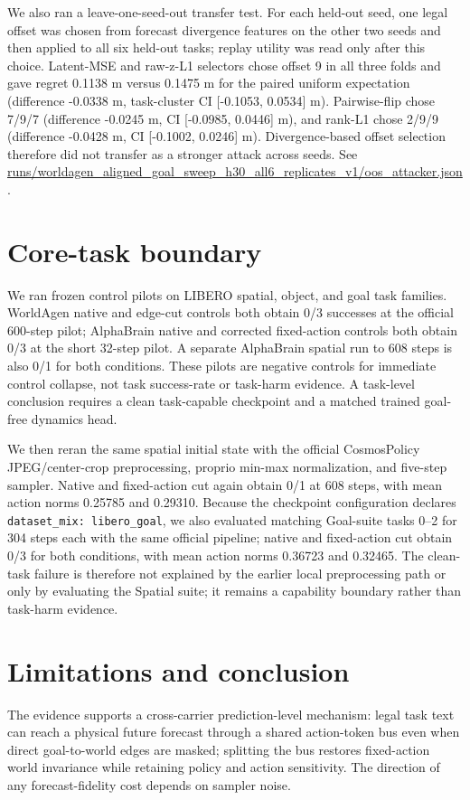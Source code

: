 \documentclass[10pt]{article}
\begin{document}
We also ran a leave-one-seed-out transfer test. For each held-out seed, one legal offset was chosen from forecast divergence features on the other two seeds and then applied to all six held-out tasks; replay utility was read only after this choice. Latent-MSE and raw-z-L1 selectors chose offset 9 in all three folds and gave regret 0.1138 m versus 0.1475 m for the paired uniform expectation (difference -0.0338 m, task-cluster CI [-0.1053, 0.0534] m). Pairwise-flip chose 7/9/7 (difference -0.0245 m, CI [-0.0985, 0.0446] m), and rank-L1 chose 2/9/9 (difference -0.0428 m, CI [-0.1002, 0.0246] m). Divergence-based offset selection therefore did not transfer as a stronger attack across seeds. See \url{runs/worldagen_aligned_goal_sweep_h30_all6_replicates_v1/oos_attacker.json}.

\section{Core-task boundary}
We ran frozen control pilots on LIBERO spatial, object, and goal task families. WorldAgen native and edge-cut controls both obtain 0/3 successes at the official 600-step pilot; AlphaBrain native and corrected fixed-action controls both obtain 0/3 at the short 32-step pilot. A separate AlphaBrain spatial run to 608 steps is also 0/1 for both conditions. These pilots are negative controls for immediate control collapse, not task success-rate or task-harm evidence. A task-level conclusion requires a clean task-capable checkpoint and a matched trained goal-free dynamics head.

We then reran the same spatial initial state with the official CosmosPolicy JPEG/center-crop preprocessing, proprio min-max normalization, and five-step sampler. Native and fixed-action cut again obtain 0/1 at 608 steps, with mean action norms 0.25785 and 0.29310. Because the checkpoint configuration declares \texttt{dataset\_mix: libero\_goal}, we also evaluated matching Goal-suite tasks 0--2 for 304 steps each with the same official pipeline; native and fixed-action cut obtain 0/3 for both conditions, with mean action norms 0.36723 and 0.32465. The clean-task failure is therefore not explained by the earlier local preprocessing path or only by evaluating the Spatial suite; it remains a capability boundary rather than task-harm evidence.

\section{Limitations and conclusion}
The evidence supports a cross-carrier prediction-level mechanism: legal task text can reach a physical future forecast through a shared action-token bus even when direct goal-to-world edges are masked; splitting the bus restores fixed-action world invariance while retaining policy and action sensitivity. The direction of any forecast-fidelity cost depends on sampler noise.
\end{document}
